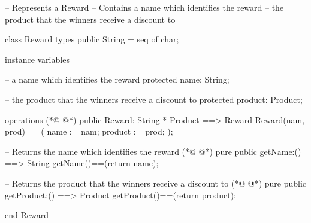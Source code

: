 \begin{vdmpp}[breaklines=true]
-- Represents a Reward
-- Contains a name which identifies the reward
--      the product that the winners receive a discount to

class Reward
 types
  public String = seq of char;
  
 instance variables
 
   -- a name which identifies the reward
  protected name: String;
  
  -- the product that the winners receive a discount to
   protected product: Product;
    
  operations 
(*@
\label{Reward:18}
@*)
   public Reward: String * Product ==> Reward
     Reward(nam, prod)==
     (
     name := nam;
     product := prod;
     );
   
  -- Returns the name which identifies the reward
(*@
\label{getName:26}
@*)
   pure public getName:() ==> String
   getName()==(return name);
   
   -- Returns the product that the winners receive a discount to
(*@
\label{getProduct:30}
@*)
   pure public getProduct:() ==> Product
   getProduct()==(return product);
  

   
end Reward
\end{vdmpp}
